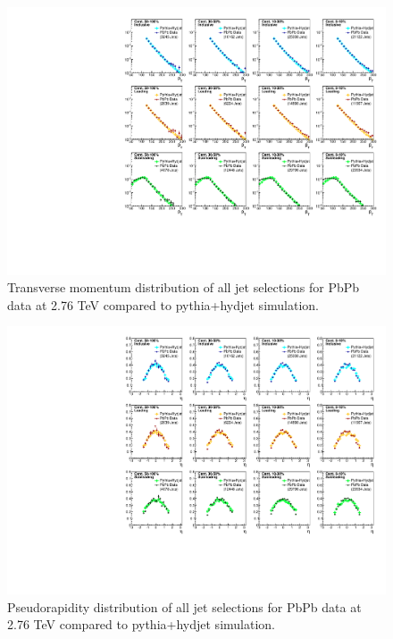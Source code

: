  
  \begin{figure}[h!]
 \begin{center}
 \includegraphics[width=1\textwidth]{figures/Appendices/JetSpectra_MC_Data_HydJet_RecoJet_JetEtaCut16.pdf}
 \caption{Transverse momentum distribution of all jet selections for PbPb data  at 2.76 TeV compared to {\sc pythia+hydjet} simulation.}
 \label{fig:PbPbJetPt}
 \end{center}
 \end{figure}


 \begin{figure}[h!]
 \begin{center}
 \includegraphics[width=1\textwidth]{figures/Appendices/JetEta_MC_Data_HydJet_RecoJet_JetEtaCut16.pdf}
 \caption{ Pseudorapidity distribution of all jet selections for PbPb data at 2.76 TeV compared to {\sc pythia+hydjet} simulation.}
  \label{fig:PbPbJetEta}
 \end{center}
 \end{figure}
 
